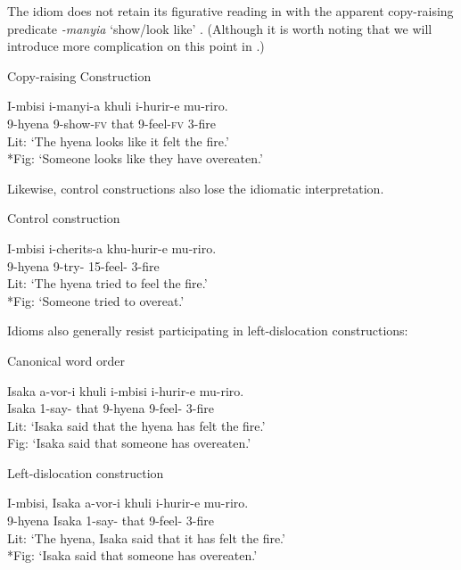 \documentclass[output=paper,colorlinks,citecolor=brown
]{langscibook}
\begin{document}
\noindent The idiom does not retain its figurative reading in  with the apparent copy-raising predicate \textit{-manyia} `show/look like' \citep[28-29]{diercksetal2022luyia}. (Although it is worth noting that we will introduce more complication on this point in .)

\ea \label{ex:johnson:IdiomCR}
{{Copy-raising Construction}}

\gll I-mbisi i-manyi-a khuli i-hurir-e mu-riro.\\
9-hyena 9\Sm-show-\textsc{fv} that 9\Sm-feel-\textsc{fv} 3-fire\\
\glt Lit: `The hyena looks like it felt the fire.'\\
*Fig: `Someone looks like they have overeaten.'

\citep[102]{diercksetal2022luyia}
\z

\noindent Likewise, control constructions also lose the idiomatic interpretation.

 

\ea
{{Control construction}}

\gll I-mbisi i-cherits-a khu-hurir-e mu-riro.\\
9-hyena 9\Sm-try-\Fv{} 15-feel-\Fv{} 3-fire\\
\glt Lit: `The hyena tried to feel the fire.'\\
*Fig: `Someone tried to overeat.'

\citep[100]{diercksetal2022luyia}
\z

\noindent Idioms also generally resist participating in left-dislocation constructions: 

\ea
\begin{xlist}

\ex
{{Canonical word order}}

\gll Isaka a-vor-i khuli i-mbisi i-hurir-e mu-riro.\\
Isaka 1\Sm-say-\Fv{} that 9-hyena 9\Sm-feel-\Fv{} 3-fire\\
\glt Lit: `Isaka said that the hyena has felt the fire.'\\
Fig: `Isaka said that someone has overeaten.'

\ex
{{Left-dislocation construction}}

\gll I-mbisi, Isaka a-vor-i khuli i-hurir-e mu-riro.\\
9-hyena	Isaka 1\Sm-say-\Fv{} that 9\Sm-feel-\Fv{} 3-fire	\\
\glt Lit: `The hyena, Isaka said that it has felt the fire.'\\
*Fig: `Isaka said that someone has overeaten.'

\end{xlist}
\z
\end{document}
